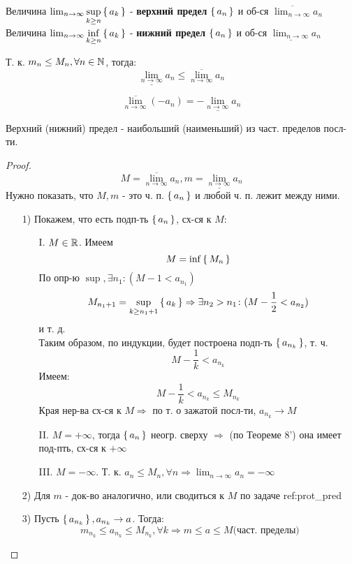 \begin{definition}
Величина $\lim_{n\to\infty} \underset{k \geq n}{\sup} \set{a_k}$ - \textbf{верхний предел} $\set{a_n}$ и об-ся $\overline{\lim_{n\to\infty}}a_n$ \\

Величина $\lim_{n\to\infty} \underset{k \geq n}{\inf} \set{a_k}$ - \textbf{нижний предел} $\set{a_n}$ и об-ся $\underline{\lim_{n\to\infty}}a_n$
\end{definition}
\begin{note}
Т. к. $m_n \leq M_n, \forall n \in \mathbb{N}$, тогда:
\[
\underline{\lim_{n\to\infty}}a_n \leq \overline{\lim_{n\to\infty}}a_n
\]
\end{note}
\begin{task}
  \label{prot_pred}
\[
\overline{\lim_{n\to\infty}}(-a_n) = -\underline{\lim_{n\to\infty}}a_n
\]
\end{task}
\begin{theorem}
Верхний (нижний) предел - наибольший (наименьший) из част. пределов посл-ти.
\end{theorem}
\begin{proof}
\[
M = \overline{\lim_{n\to\infty}}a_n, m = \underline{\lim_{n\to\infty}}a_n
\]
Нужно показать, что $M, m$ - это ч. п. $\set{a_n}$  и любой ч. п. лежит между ними.
\begin{itemize}
  \item [1) ]  Покажем, что есть подп-ть $\set{a_n}$, сх-ся к $M$:
    \begin{itemize}
      \item [I. ] $M \in \mathbb{R}$. Имеем
        \[
          M = \inf \set{M_n}
        \]
        По опр-ю $\sup, \exists n_1 \colon (M - 1 < a_{n_1})$
        \[
        M_{n_1 + 1} = \underset{k \geq n_1 + 1}{\sup} \set{a_k} \Rightarrow \exists n_2 > n_1 \colon (M - \frac{1}{2} < a_{n_2}) 
        \] и т. д. \\
        Таким образом, по индукции, будет построена подп-ть $\set{a_{n_k}}$, т. ч.
        \[
          M - \frac{1}{k} < a_{n_k}
        \]
        Имеем:
        \[
        M - \frac{1}{k} < a_{n_k} \leq M_{n_k}
        \]
        Края нер-ва сх-ся к $M \Rightarrow $ по т. о зажатой посл-ти, $a_{n_k} \rightarrow M$
      \item [II. ] $M = +\infty$, тогда $\set{a_n}$ неогр. сверху $\Rightarrow$ (по Теореме 8') она имеет под-пть, сх-ся к $+\infty$
      \item [III. ] $M = -\infty$. Т. к. $a_n \leq M_n, \forall n \Rightarrow \lim_{n\to\infty} a_n = -\infty$
    \end{itemize}
  \item [2) ] Для $m$ - док-во аналогично, или сводиться к $M$ по задаче ref:{prot_pred}
  \item [3) ] Пусть $\set{a_{n_k}}, a_{n_k} \rightarrow a$. Тогда:
    \[
    m_{n_k} \leq a_{n_k} \leq M_{n_k}, \forall k \Rightarrow m \leq a \leq M \text{(част. пределы)}
    \]
\end{itemize}
\end{proof}
